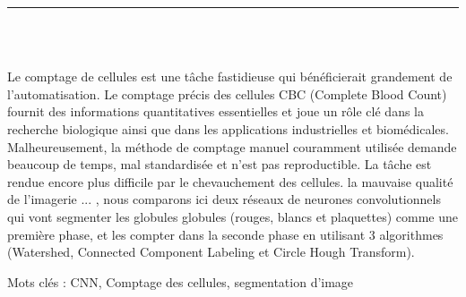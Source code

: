 \vspace*{0.2in}

\thispagestyle{empty}

\begin{center}
    {\color{Black} \rule{3in}{1.4mm} }\\
    \vspace{0.1in}
    \scshape{\fontsize{34}{46}{\bfseries{\color{Black}{Résumé}}}}
    \\
    \vspace{0.6in}
\end{center}
\hspace{\parindent}

\begin{changemargin}{0.9cm}{0.9cm}
Le comptage de cellules est une tâche fastidieuse qui bénéficierait grandement de l'automatisation. Le comptage précis des cellules CBC (Complete Blood Count) fournit des informations quantitatives essentielles et joue un rôle clé dans la recherche biologique ainsi que dans les applications industrielles et biomédicales. Malheureusement, la méthode de comptage manuel couramment utilisée demande beaucoup de temps, mal standardisée et n'est pas reproductible. La tâche est rendue encore plus difficile par le chevauchement des cellules. la mauvaise qualité de l'imagerie ... , nous comparons ici deux réseaux de neurones convolutionnels qui vont segmenter les globules globules (rouges, blancs et plaquettes) comme une première phase, et les compter dans la seconde phase en utilisant 3 algorithmes (Watershed, Connected Component Labeling et Circle Hough Transform).
\end{changemargin}

\vspace{1in}

\begin{changemargin}{0.9cm}{0.9cm}
\hspace{-\parindent}
Mots clés : CNN, Comptage des cellules, segmentation d'image
\end{changemargin}
